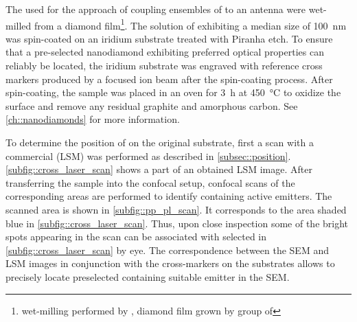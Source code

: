 			The \nds used for the approach of coupling ensembles of \sivs to an antenna were wet-milled from a \CVD diamond film\footnote{wet-milling performed by \muzha, diamond film grown by group of \williams}.
			The solution of \nds exhibiting a median size of \SI{100}{nm} was spin-coated on an iridium substrate treated with Piranha etch.
			To ensure that a pre-selected nanodiamond exhibiting preferred optical properties can reliably be located, the iridium substrate was engraved with reference cross markers produced by a focused ion beam after the spin-coating process.
			After spin-coating, the sample was placed in an oven for \SI{3}{\hour} at \SI{450}{\celsius} to oxidize the surface and remove any residual graphite and amorphous carbon. See \autoref{ch::nanodiamonds} for more information.

			To determine the position of \nds on the original substrate, first a scan with a commercial \lsm (LSM) was performed as described in \autoref{subsec::position}.
			\autoref{subfig::cross_laser_scan} shows a part of an obtained LSM image.
			After transferring the sample into the confocal setup, confocal \fl scans of the corresponding areas are performed to identify \nds containing active emitters.
			The scanned area is shown in \autoref{subfig::pp_pl_scan}. It corresponds to the area shaded blue in \autoref{subfig::cross_laser_scan}. Thus, upon close inspection some of the bright spots appearing in the \fl scan can be associated with selected \nds in \autoref{subfig::cross_laser_scan} by eye. The correspondence between the SEM and LSM images in conjunction with the cross-markers on the substrates allows to precisely locate preselected \nds containing suitable emitter in the SEM.

